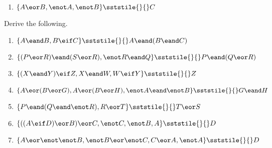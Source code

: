 \begin{enumerate}[label=(\arabic*)]
\item $\{A \eor B, \enot A, \enot B\} \sststile{}{} C$				%

\end{enumerate}


\noindent\problempart Derive the following.
\begin{enumerate}[label=(\arabic*)]

\item $\{A \eand B, B \eif C\} \sststile{}{} A \eand (B \eand C) $ %


\item $\{(P \eor R) \eand (S \eor R), \enot R \eand Q\} \sststile{}{} P \eand (Q \eor R)$		%
\item $\{(X \eand Y) \eif Z, X \eand W, W \eif Y\} \sststile{}{} Z$ 	%


\item $\{A \eor  (B \eor  G), A \eor  (B \eor  H), \enot A \eand \enot B\} \sststile{}{} G \eand H $		%

\item $\{P \eand (Q \eand \enot R), R \eor T\} \sststile{}{} T \eor S$ 		%
\item $\{((A \eif D) \eor B) \eor C, \enot C, \enot B, A\} \sststile{}{} D$
\item $\{A \eor \enot\enot B, \enot B \eor \enot C, C \eor A, \enot A\} \sststile{}{}D		$			%
\end{enumerate}


